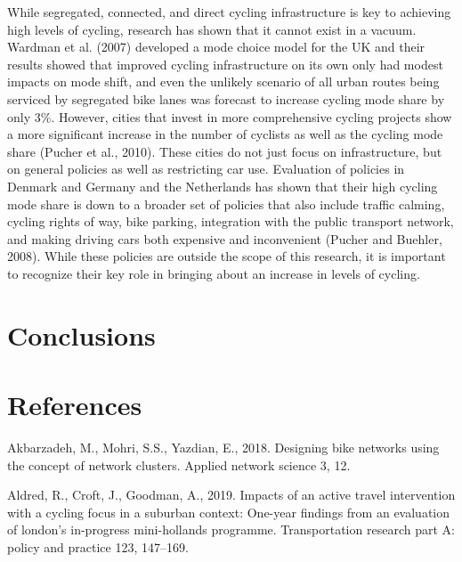 \documentclass[]{elsarticle} %
\begin{document}
While segregated, connected, and direct cycling infrastructure is key to
achieving high levels of cycling, research has shown that it cannot
exist in a vacuum. Wardman et al. (2007) developed a mode choice model
for the UK and their results showed that improved cycling infrastructure
on its own only had modest impacts on mode shift, and even the unlikely
scenario of all urban routes being serviced by segregated bike lanes was
forecast to increase cycling mode share by only 3\%. However, cities
that invest in more comprehensive cycling projects show a more
significant increase in the number of cyclists as well as the cycling
mode share (Pucher et al., 2010). These cities do not just focus on
infrastructure, but on general policies as well as restricting car use.
Evaluation of policies in Denmark and Germany and the Netherlands has
shown that their high cycling mode share is down to a broader set of
policies that also include traffic calming, cycling rights of way, bike
parking, integration with the public transport network, and making
driving cars both expensive and inconvenient (Pucher and Buehler, 2008).
While these policies are outside the scope of this research, it is
important to recognize their key role in bringing about an increase in
levels of cycling.

\hypertarget{conclusions}{%
\section{Conclusions}\label{conclusions}}

\hypertarget{references}{%
\section*{References}\label{references}}

\setlength{\parindent}{-0.5in}
\setlength{\leftskip}{0.5in}
\setlength{\parskip}{8pt}

\hypertarget{refs}{}
\leavevmode\hypertarget{ref-akbarzadeh2018designing}{}%
Akbarzadeh, M., Mohri, S.S., Yazdian, E., 2018. Designing bike networks
using the concept of network clusters. Applied network science 3, 12.

\leavevmode\hypertarget{ref-aldred2019impacts}{}%
Aldred, R., Croft, J., Goodman, A., 2019. Impacts of an active travel
intervention with a cycling focus in a suburban context: One-year
findings from an evaluation of london's in-progress mini-hollands
programme. Transportation research part A: policy and practice 123,
147--169.
\end{document}
